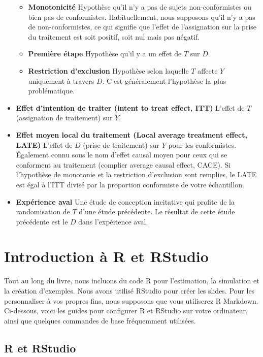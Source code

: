 \documentclass[
  12pt,
]{book}
\providecommand{\tightlist}{%
  \setlength{\itemsep}{0pt}\setlength{\parskip}{0pt}}
\begin{document}
\begin{itemize}
  \begin{itemize}
  \tightlist
  \item
    \textbf{Monotonicité} Hypothèse qu'il n'y a pas de sujets non-conformistes ou bien pas de conformistes.
    Habituellement, nous supposons qu'il n'y a pas de non-conformistes, ce qui signifie que l'effet de l'assignation sur la prise du traitement est soit positif, soit nul mais pas négatif.
  \item
    \textbf{Première étape} Hypothèse qu'il y a un effet de \(T\) sur \(D\).
  \item
    \textbf{Restriction d'exclusion} Hypothèse selon laquelle \(T\) affecte \(Y\) uniquement à travers \(D\). C'est généralement l'hypothèse la plus problématique.
  \end{itemize}
\item
  \textbf{Effet d'intention de traiter (intent to treat effect, ITT)} L'effet de \(T\) (assignation de traitement) sur \(Y\).
\item
  \textbf{Effet moyen local du traitement (Local average treatment effect, LATE)} L'effet de \(D\) (prise de traitement) sur \(Y\) pour les conformistes.
  Également connu sous le nom d'effet causal moyen pour ceux qui se conforment au traitement (complier average causal effect, CACE).
  Si l'hypothèse de monotonie et la restriction d'exclusion sont remplies, le LATE est égal à l'ITT divisé par la proportion conformiste de votre échantillon.
\item
  \textbf{Expérience aval} Une étude de conception incitative qui profite de la randomisation de \(T\) d'une étude précédente.
  Le résultat de cette étude précédente est le \(D\) dans l'expérience aval.
\end{itemize}

\hypertarget{introduction-uxe0-r-et-rstudio}{%
\chapter{Introduction à R et RStudio}\label{introduction-uxe0-r-et-rstudio}}

Tout au long du livre, nous incluons du code R pour l'estimation, la simulation et la création d'exemples. Nous avons utilisé RStudio pour créer les slides. Pour les personnaliser à vos propres fins, nous supposons que vous utiliserez R Markdown. Ci-dessous, voici les guides pour configurer R et RStudio sur votre ordinateur, ainsi que quelques commandes de base fréquemment utilisées.

\hypertarget{r-et-rstudio}{%
\section{R et RStudio}\label{r-et-rstudio}}
\end{document}
